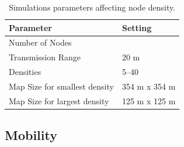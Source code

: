 \begin{table}[ht]
	\footnotesize
	\centering
	
	\begin{tabular}{ll}
		\textbf{Parameter} & \textbf{Setting} \\
		
		\midrule
		Number of Nodes & \nodesNumber \\
		Transmission Range & 20 m \\
		Densities & 5--40 \\
		Map Size for smallest density & 354 m x 354 m \\
		Map Size for largest density & 125 m x 125 m \\
	\end{tabular}
	
	\caption{Simulations parameters affecting node density.}
	\label{tbl:densisty-parameters}
\end{table}



%
%

%

\subsection*{Mobility}

